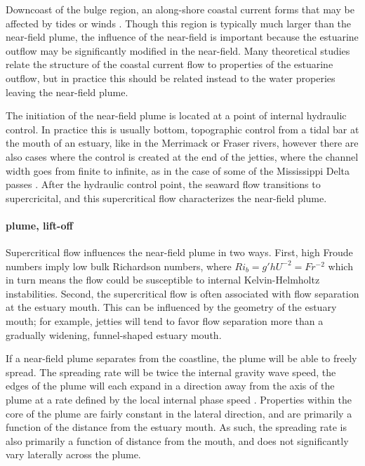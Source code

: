 \documentclass[12pt]{article}
\begin{document}
Downcoast of the bulge region, an along-shore coastal current forms \citep{} that may be affected by tides \citep{deboer.ea:08,pritchard.huntley:06} or winds \citep{fong.geyer:01,hetland:05,lentz:04,jurisa.chant:13}. Though this region is typically much larger than the near-field plume, the influence of the near-field is important because the estuarine outflow may be significantly modified in the near-field. Many theoretical studies relate the structure of the coastal current flow to properties of the estuarine outflow, but in practice this should be related instead to the water properies leaving the near-field plume.

The initiation of the near-field plume is located at a point of internal hydraulic control. In practice this is usually bottom, topographic control from a tidal bar at the mouth of an estuary, like in the Merrimack \citep{macdonald.ea:07} or Fraser \citep{macdonald.geyer:05} rivers, however there are also cases where the control is created at the end of the jetties, where the channel width goes from finite to infinite, as in the case of some of the Mississippi Delta passes \citep{wright.coleman:71}. After the hydraulic control point, the seaward flow transitions to supercricital, and this supercritical flow characterizes the near-field plume. \paragraph{plume, lift-off}

Supercritical flow influences the near-field plume in two ways. First, high Froude numbers imply low bulk Richardson numbers, where $Ri_b = g' h U^{-2} = Fr^{-2}$ which in turn means the flow could be susceptible to internal Kelvin-Helmholtz instabilities. Second, the supercritical flow is often associated with flow separation at the estuary mouth. This can be influenced by the geometry of the estuary mouth; for example, jetties will tend to favor flow separation more than a gradually widening, funnel-shaped estuary mouth.



If a near-field plume separates from the coastline, the plume will be able to freely spread. The spreading rate will be twice the internal gravity wave speed, the edges of the plume will each expand in a direction away from the axis of the plume at a rate defined by the local internal phase speed \citep{hetland.macdonald:08}. Properties within the core of the plume are fairly constant in the lateral direction, and are primarily a function of the distance from the estuary mouth. As such, the spreading rate is also primarily a function of distance from the mouth, and does not significantly vary laterally across the plume. 
\end{document}

